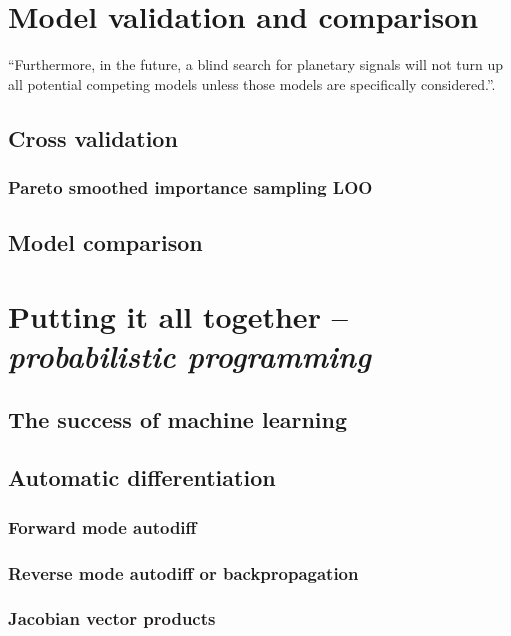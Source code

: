 \documentclass[12pt]{report}
\begin{document}
\section{Model validation and comparison}
\label{sec:model_comparison}

``Furthermore, in the future, a blind search for planetary signals will not
turn up all potential competing models unless those models
are specifically considered.''\citep{2017AJ....153..129J}.
\citet{2021AJ....162...59R}
\citet{2020AJ....160...17H}

\subsection{Cross validation}
\subsubsection{Pareto smoothed importance sampling LOO}
\subsection{Model comparison}

\section{Putting it all together -- \emph{probabilistic programming}}
\label{sec:programming}
\subsection{The success of machine learning}
\subsection{Automatic differentiation}
\subsubsection{Forward mode autodiff}
\subsubsection{Reverse mode autodiff or backpropagation}
\subsubsection{Jacobian vector products}
\end{document}
